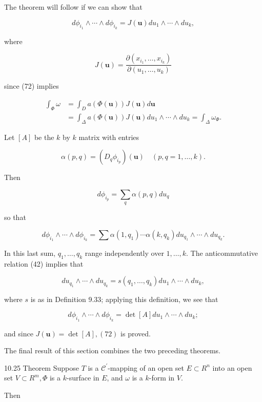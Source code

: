 \documentclass[10pt]{article}
\begin{document}
The theorem will follow if we can show that

$$
d \phi_{i_{1}} \wedge \cdots \wedge d \phi_{i_{k}}=J(\mathbf{u}) d u_{1} \wedge \cdots \wedge d u_{k},
$$

where

$$
J(\mathbf{u})=\frac{\partial\left(x_{i_{1}}, \ldots, x_{i_{k}}\right)}{\partial\left(u_{1}, \ldots, u_{k}\right)}
$$

since (72) implies

$$
\begin{aligned}
\int_{\Phi} \omega & =\int_{D} a(\Phi(\mathbf{u})) J(\mathbf{u}) d \mathbf{u} \\
& =\int_{\Delta} a(\Phi(\mathbf{u})) J(\mathbf{u}) d u_{1} \wedge \cdots \wedge d u_{k}=\int_{\Delta} \omega_{\Phi} .
\end{aligned}
$$

Let $[A]$ be the $k$ by $k$ matrix with entries

$$
\alpha(p, q)=\left(D_{q} \phi_{i_{p}}\right)(\mathbf{u}) \quad(p, q=1, \ldots, k) .
$$

Then

$$
d \phi_{i_{p}}=\sum_{q} \alpha(p, q) d u_{q}
$$

so that

$$
d \phi_{i_{1}} \wedge \cdots \wedge d \phi_{i_{k}}=\sum \alpha\left(1, q_{1}\right) \cdots \alpha\left(k, q_{k}\right) d u_{q_{1}} \wedge \cdots \wedge d u_{q_{k}} .
$$

In this last sum, $q_{1}, \ldots, q_{k}$ range independently over $1, \ldots, k$. The anticommutative relation (42) implies that

$$
d u_{q_{1}} \wedge \cdots \wedge d u_{q_{k}}=s\left(q_{1}, \ldots, q_{k}\right) d u_{1} \wedge \cdots \wedge d u_{k},
$$

where $s$ is as in Definition 9.33; applying this definition, we see that

$$
d \phi_{i_{1}} \wedge \cdots \wedge d \phi_{i_{k}}=\operatorname{det}[A] d u_{1} \wedge \cdots \wedge d u_{k} ;
$$

and since $J(\mathbf{u})=\operatorname{det}[A],(72)$ is proved.

The final result of this section combines the two preceding theorems.

10.25 Theorem Suppose $T$ is a $\mathscr{C}^{\prime}$-mapping of an open set $E \subset R^{n}$ into an open set $V \subset R^{m}, \Phi$ is a $k$-surface in $E$, and $\omega$ is a $k$-form in $V$.

Then
\end{document}
